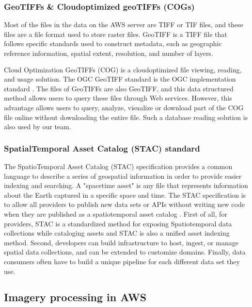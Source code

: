 \documentclass[conference]{IEEEtran}
\begin{document}
\subsubsection{GeoTIFFs \& Cloud\-optimized geoTIFFs (COGs)}

Most of the files in the data on the AWS server are TIFF or TIF files, and these files are a file format used to 
store raster files. GeoTIFF is a TIFF file that follows specific standards used to construct metadata, such as geographic 
reference information, spatial extent, resolution, and number of layers.

Cloud Optimization GeoTIFFs (COG) is a cloud\-optimized file viewing, reading, and usage solution. The OGC GeoTIFF standard 
is the OGC implementation standard \cite{NASA23:online}. The files of GeoTIFFs are also GeoTIFF, and this data structured 
method allows users to query these files through Web services. However, this advantage allows users to query, analyze, visualize 
or download part of the COG file online without downloading the entire file. Such a database reading solution is also used by our team.

\subsubsection{Spatial\-Temporal Asset Catalog (STAC) standard}

The SpatioTemporal Asset Catalog (STAC) specification provides a common language to describe a series of geospatial 
information in order to provide easier indexing and searching. A "space\-time asset" is any file that represents information 
about the Earth captured in a specific space and time. The STAC specification is to allow all providers to publish new data 
sets or APIs without writing new code when they are published as a spatiotemporal asset catalog \cite{SpatioTe21:online}. 
First of all, for providers, STAC is a standardized method for exposing Spatio\-temporal data collections while cataloging 
assets and STAC is also a unified asset indexing method. Second, developers can build infrastructure to host, ingest, or 
manage spatial data collections, and can be extended to customize domains. Finally, data consumers often have to build a 
unique pipeline for each different data set they use.


\subsection{Imagery processing in AWS}
\end{document}
